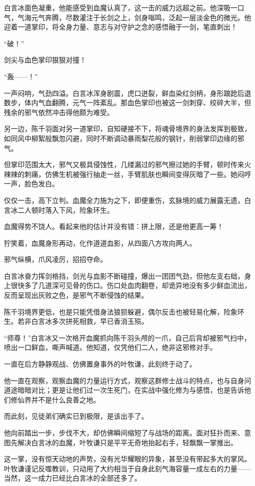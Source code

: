 白言冰面色凝重，他能感受到血魔认真了，这一击的威力远超之前。他深吸一口气，气海元气奔腾，尽数灌注于长剑之上，剑身嗡鸣，泛起一层淡金色的微光。他迎着一道掌印，将全身力量、意志与对守护之念的感悟融于一剑，笔直刺出！

“破！”

剑尖与血色掌印狠狠对撞！

“轰——！”

一声闷响，气劲四溢。白言冰浑身剧震，虎口迸裂，鲜血染红剑柄，身形踉跄后退数步，体内气血翻腾，元气一阵紊乱。那血色掌印也被这一剑刺穿、绞碎大半，但残余的邪气依然冲击得他颇为难受。

另一边，陈千羽面对另一道掌印，自知硬接不下，将魂骨境界的身法发挥到极致，如同风中柳絮般飘忽闪避，同时不断调动暴雨梨花般的钢针，削弱掌印边缘的邪气。

但掌印范围太大，邪气又极具侵蚀性，几缕漏过的邪气擦过她的手臂，顿时传来火辣辣的刺痛，仿佛生机被强行抽走一丝，手臂肌肤也瞬间变得灰暗了一些。她闷哼一声，脸色发白。

仅仅一击，高下立判。血魔全力施为之下，即便重伤，玄脉境的威力展露无遗，白言冰二人顿时落入下风，险象环生。

血魔得势不饶人。看起来他的估计并没有错：拼上限，还是他更高一筹！

狞笑着，血魔身形再动，化作道道血影，从四面八方攻向两人。

邪气纵横，爪风凌厉，招招夺命。

白言冰奋力挥剑格挡，剑光与血影不断碰撞，爆出一团团气劲，但他左支右绌，身上很快多了几道深可见骨的伤口。伤口处血肉翻卷，却诡异地没有多少鲜血流出，反而呈现出灰败之色，是邪气不断侵蚀的结果。

陈千羽境界更低，也是只能凭借身法狼狈躲避，偶尔反击也被轻易化解，险象环生。若非白言冰多次拼死相救，早已香消玉殒。

“师尊！”白言冰又一次格开血魔抓向陈千羽头颅的一爪，自己后背却被邪气扫中，喷出一口鲜血，嘶声喊道。他知道，仅凭他们二人，绝非这邪修对手。

一直在后方静静观战、仿佛置身事外的叶牧谦，此刻终于动了。

他一直在观察，观察血魔的力量运行方式，观察这群修士战斗的特点，也与自身问道途暗暗对比；更是让他们过一次生死门，在实战中强化修为与感悟，也是告诉他们修仙界并不是什么良善之地。

而此刻，见徒弟们确实已到极限，是该出手了。

他向前踏出一步，步伐不大，却仿佛瞬间缩短了与战场的距离。面对狂扑而来、意图先解决白言冰的血魔，叶牧谦只是平平无奇地抬起右手，轻飘飘一掌推出。

这一掌，没有惊天动地的声势，没有光华耀眼的异象，甚至没有带起多大的掌风。叶牧谦谨记反噬教训，只动用了大约相当于自身此刻气海容量一成左右的力量——当然，这一成力已经比白言冰的全部还多了。

